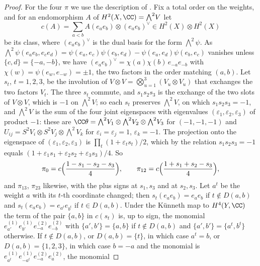 \begin{proof}
For the four $\pi$ we use the description of . Fix a
total order on the weights, and for an endomorphism $A$ of
$H^{2}(X,\CC)={\textstyle\bigwedge^{2}}V$ let
\[
  c(A)=\sum_{a<b}A(e_{a}e_{b})\otimes(e_{a}e_{b})^{\vee}
  \in H^{2}(X)\otimes H^{2}(X)
\]
be its class, where $(e_{a}e_{b})^{\vee}$ is the dual basis for the form
${\textstyle\bigwedge^{2}}\psi$. As
${\textstyle\bigwedge^{2}}\psi(e_{a}e_{b},e_{c}e_{d})
=\psi(e_{a},e_{c})\psi(e_{b},e_{d})-\psi(e_{a},e_{d})\psi(e_{b},e_{c})$
vanishes unless $\{c,d\}=\{-a,-b\}$, we have
$(e_{a}e_{b})^{\vee}=\chi(a)\chi(b)\,e_{-a}e_{-b}$ with
$\chi(w)=\psi(e_{w},e_{-w})=\pm1$, the two factors in the order matching
$(a,b)$. Let $s_{t}$, $t=1,2,3$, be the involution of
$V\otimes V=\bigotimes_{u=1}^{3}(V_{u}\otimes V_{u})$ that exchanges the two
factors $V_{t}$. The three $s_{t}$ commute, and $s_{1}s_{2}s_{3}$ is the
exchange of the two slots of $V\otimes V$, which is $-1$ on
${\textstyle\bigwedge^{2}}V$; so each $s_{t}$ preserves
${\textstyle\bigwedge^{2}}V$, on which $s_{1}s_{2}s_{3}=-1$, and
${\textstyle\bigwedge^{2}}V$ is the sum of the four joint eigenspaces with
eigenvalues $(\varepsilon_{1},\varepsilon_{2},\varepsilon_{3})$ of product
$-1$: these are $\CC\theta={\textstyle\bigwedge^{2}}V_{1}\otimes
{\textstyle\bigwedge^{2}}V_{2}\otimes{\textstyle\bigwedge^{2}}V_{3}$ for
$(-1,-1,-1)$ and $U_{ij}=S^{2}V_{i}\otimes S^{2}V_{j}\otimes
{\textstyle\bigwedge^{2}}V_{k}$ for $\varepsilon_{i}=\varepsilon_{j}=1$,
$\varepsilon_{k}=-1$. The projection onto the eigenspace of
$(\varepsilon_{1},\varepsilon_{2},\varepsilon_{3})$ is
$\prod_{t}(1+\varepsilon_{t}s_{t})/2$, which by the relation
$s_{1}s_{2}s_{3}=-1$ equals
$(1+\varepsilon_{1}s_{1}+\varepsilon_{2}s_{2}+\varepsilon_{3}s_{3})/4$. So
\[
  \pi_{0}=c\Bigl(\frac{1-s_{1}-s_{2}-s_{3}}{4}\Bigr),\qquad
  \pi_{12}=c\Bigl(\frac{1+s_{1}+s_{2}-s_{3}}{4}\Bigr),
\]
and $\pi_{13}$, $\pi_{23}$ likewise, with the plus signs at $s_{1},s_{3}$
and at $s_{2},s_{3}$. Let $a^{t}$ be the weight $a$ with its $t$-th
coordinate changed; then $s_{t}(e_{a}e_{b})=e_{a}e_{b}$ if $t\notin D(a,b)$
and $s_{t}(e_{a}e_{b})=e_{a^{t}}e_{b^{t}}$ if $t\in D(a,b)$. Under the
K\"unneth map to $H^{4}(Y,\CC)$ the term of the pair $\{a,b\}$ in $c(s_{t})$
is, up to sign, the monomial $e^{(1)}_{a'}e^{(1)}_{b'}e^{(2)}_{-a}e^{(2)}_{-b}$
with $\{a',b'\}=\{a,b\}$ if $t\notin D(a,b)$ and $\{a',b'\}=\{a^{t},b^{t}\}$
otherwise. If $t\notin D(a,b)$, or $D(a,b)=\{t\}$, in which case $a^{t}=b$,
or $D(a,b)=\{1,2,3\}$, in which case $b=-a$ and the monomial is
$e^{(1)}_{a^{t}}e^{(1)}_{-a^{t}}e^{(2)}_{-a}e^{(2)}_{a}$, the monomial

\end{proof}
